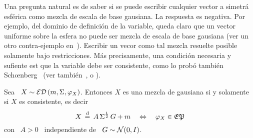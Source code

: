 Una  pregunta natural  es  de saber  si  se puede  escribir  cualquier vector  a
simetr\'a  esf\'erica como mezcla  de escala  de base  gausiana.  La  respuesta es
negativa. Por ejemplo,  del dominio de definici\'on de  la variable, queda claro
que un  vector uniforme sobre la  esfera no puede  ser mezcla de escala  de base
gausiana (ver  un otro contra-ejemplo en~\cite{Pic70}).  Escribir  un vecor como
tal mezcla  resuelte posible  solamente bajo restricciones.  M\'as precisamente,
una condici\'on necesaria  y sufiente est que la  variable debe ser consistente,
como    lo    prob\'o    tambi\'en    Sch{\oe}nberg~\cite[Teo.~2]{Sch38}    (ver
tambi\'en~\cite[Teo.~2]{SteVan05},            \cite[Lem.~2.2]{Yao73}           o
\cite[Teo.~1]{Kan94}).
%
\begin{teorema}
\label{Teo:MP:SchoenbergCaracteristica}
%
  Sea \ $X \sim  \mathcal{ED}\left( m , \Sigma , \varphi_X \right)$.  Entonces $X$ es una
  mezcla de  gausiana si y  solamente si $X$  es consistente, es decir
  \[
  X \,  \stackrel{\mathrm{d}}{=} \,  A \, \Sigma^{\frac12}  \, G  + m \quad  \Leftrightarrow \quad
  \varphi_X \in \mathfrak{EP}
  \]
  con \ $A > 0$ \ independiente de \ $G \sim \mathcal{N}(0,I)$.
\end{teorema}
%
